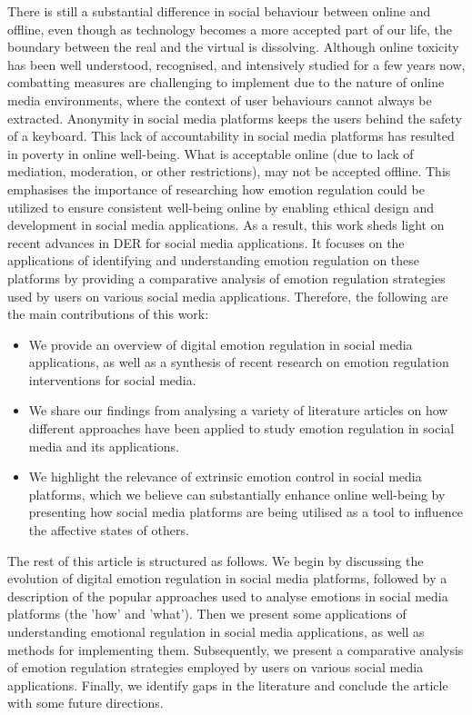 \documentclass[lettersize,journal]{IEEEtran}
\begin{document}
There is still a substantial difference in social behaviour between online and offline, even though as technology becomes a more accepted part of our life, the boundary between the real and the virtual is dissolving. Although online toxicity has been well understood, recognised, and intensively studied for a few years now, combatting measures are challenging to implement due to the nature of online media environments, where the context of user behaviours cannot always be extracted. Anonymity in social media platforms keeps the users behind the safety of a keyboard. This lack of accountability in social media platforms has resulted in poverty in online well-being. What is acceptable online (due to lack of mediation, moderation, or other restrictions), may not be accepted offline. This emphasises the importance of researching how emotion regulation could be utilized to ensure consistent well-being online by enabling ethical design and development in social media applications. As a result, this work sheds light on recent advances in DER for social media applications. It focuses on the applications of identifying and understanding emotion regulation on these platforms by providing a comparative analysis of emotion regulation strategies used by users on various social media applications. Therefore, the following are the main contributions of this work:
\begin{itemize}
    \item We provide an overview of digital emotion regulation in social media applications, as well as a synthesis of recent research on emotion regulation interventions for social media.
    \item We share our findings from analysing a variety of literature articles on how different approaches have been applied to study emotion regulation in social media and its applications.
    \item We highlight the relevance of extrinsic emotion control in social media platforms, which we believe can substantially enhance online well-being by presenting how social media platforms are being utilised as a tool to influence the affective states of others. 

\end{itemize}

The rest of this article is structured as follows. We begin by discussing the evolution of digital emotion regulation in social media platforms, followed by a description of the popular approaches used to analyse emotions in social media platforms (the 'how' and 'what'). Then we present some applications of understanding emotional regulation in social media applications, as well as methods for implementing them. Subsequently, we present a comparative analysis of emotion regulation strategies employed by users on various social media applications. Finally, we identify gaps in the literature and conclude the article with some future directions.
\end{document}
